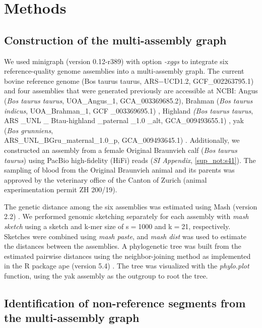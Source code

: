\documentclass[../main.tex]{subfiles}
\begin{document}
\section{Methods}

\subsection*{Construction of the multi-assembly graph}

We used minigraph \citep{li2020design} (version 0.12-r389) with option \emph{-xggs} to integrate six reference-quality genome assemblies into a multi-assembly graph. The current bovine reference genome (Bos taurus taurus, ARS$-$UCD1.2, GCF\_002263795.1) and four assemblies that were generated previously are accessible at NCBI: Angus (\emph{Bos taurus taurus}, UOA\_Angus\_1, GCA\_003369685.2)\citep{low2020haplotype}, Brahman (\emph{Bos taurus indicus}, UOA\_Brahman\_1, GCF \_003369695.1) \citep{low2020haplotype}, Highland \emph{(Bos taurus taurus}, ARS \_UNL \_ Btau-highland \_paternal \_1.0 \_alt, GCA\_009493655.1) \citep{rice2020continuous}, yak (\emph{Bos grunniens}, \\ ARS\_UNL\_BGru\_maternal\_1.0\_p, GCA\_009493645.1) \citep{rice2020continuous}. Additionally, we constructed an assembly from a female Original Braunvieh calf (\emph{Bos taurus taurus}) using PacBio high-fidelity (HiFi) reads (\emph{SI Appendix}, \ref{sup_not:s41}). The sampling of blood from the Original Braunvieh animal and its parents was approved by the veterinary office of the Canton of Zurich (animal experimentation permit ZH 200/19).

The genetic distance among the six assemblies was estimated using Mash (version 2.2) \citep{ondov2016mash}. We performed genomic sketching separately for each assembly with \emph{mash sketch } using a sketch and k-mer size of s$=$1000 and k$=$21, respectively. Sketches were combined using \emph{ mash paste}, and \emph{mash dist} was used to estimate the distances between the assemblies. A phylogenetic tree was built from the estimated pairwise distances using the neighbor-joining method \citep{saitou1987neighbor} as implemented in the R package ape (version 5.4) \citep{paradis2019ape}. The tree was visualized with the \emph{phylo.plot} function, using the yak assembly as the outgroup to root the tree.

\subsection*{Identification of non-reference segments from the multi-assembly graph}
\end{document}
